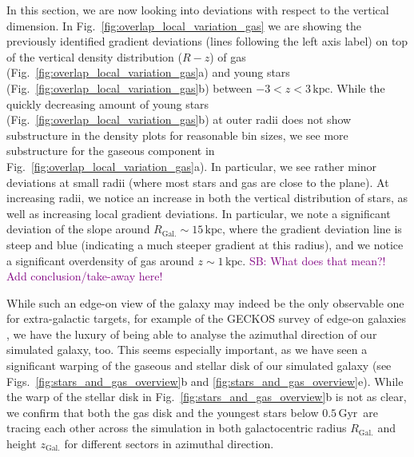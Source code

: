 \documentclass[fleqn,usenatbib]{mnras}
\newcommand{\SB}[1]{{\textcolor{purple}{SB: #1}}}
\newcommand{\nihaoAGEmax}{$0.5\,\mathrm{Gyr}$}
\begin{document}
In this section, we are now looking into deviations with respect to the vertical dimension. In Fig.~\ref{fig:overlap_local_variation_gas} we are showing the previously identified gradient deviations (lines following the left axis label) on top of the vertical density distribution ($R-z$) of gas (Fig.~\ref{fig:overlap_local_variation_gas}a) and young stars (Fig.~\ref{fig:overlap_local_variation_gas}b) between $-3 < z < 3\,\mathrm{kpc}$. While the quickly decreasing amount of young stars (Fig.~\ref{fig:overlap_local_variation_gas}b) at outer radii does not show substructure in the density plots for reasonable bin sizes, we see more substructure for the gaseous component in Fig.~\ref{fig:overlap_local_variation_gas}a). In particular, we see rather minor deviations at small radii (where most stars and gas are close to the plane). At increasing radii, we notice an increase in both the vertical distribution of stars, as well as increasing local gradient deviations. In particular, we note a significant deviation of the slope around $R_\mathrm{Gal.} \sim 15\,\mathrm{kpc}$, where the gradient deviation line is steep and blue (indicating a much steeper gradient at this radius), and we notice a significant overdensity of gas around $z \sim 1\,\mathrm{kpc}$. \SB{What does that mean?! Add conclusion/take-away here!}

While such an edge-on view of the galaxy may indeed be the only observable one for extra-galactic targets, for example of the GECKOS survey of edge-on galaxies \citep{GECKOS2023}, we have the luxury of being able to analyse the azimuthal direction of our simulated galaxy, too. This seems especially important, as we have seen a significant warping of the gaseous and stellar disk of our simulated galaxy (see Figs.~\ref{fig:stars_and_gas_overview}b and \ref{fig:stars_and_gas_overview}e). While the warp of the stellar disk in Fig.~\ref{fig:stars_and_gas_overview}b is not as clear, we confirm that both the gas disk and the youngest stars below \nihaoAGEmax\ are tracing each other across the simulation in both galactocentric radius $R_\mathrm{Gal.}$ and height $z_\mathrm{Gal.}$ for different sectors in azimuthal direction.
\end{document}

